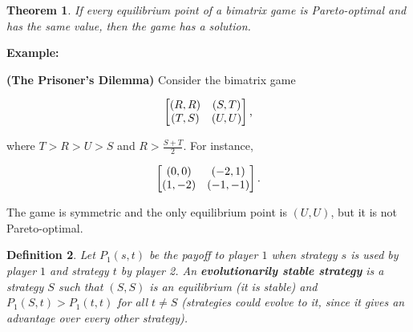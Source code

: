 \documentclass{article}
\theoremstyle{colontheorem}
\newtheorem{theorem}{Theorem}[section]
\newtheorem{definition}[theorem]{Definition}
\newenvironment{Theorem}
{
	\begin{mdframed}[backgroundcolor=TheoremOrange!10]
	\begin{theorem}
}
{
	\end{theorem}
	\end{mdframed}
	
	\vspace{.15in}
}
\newenvironment{Def}
{
	\begin{mdframed}[backgroundcolor=DefGreen!10]
	\begin{definition}
}
{
	\end{definition}
	\end{mdframed}
	
	\vspace{.15in}
}
\newenvironment{Example}
{
	\begin{mdframed}
	\textbf{Example:}%
}
{
	\end{mdframed}
	
	\vspace{.15in}
}
\begin{document}
\begin{Theorem}
	
	If every equilibrium point of a bimatrix game is Pareto-optimal and has the same value, then the game has a solution.
	
\end{Theorem}



\begin{Example}
	\textbf{(The Prisoner's Dilemma)} Consider the bimatrix game
	
	$$
	\begin{bmatrix}
	
	(R, R) & (S, T)\\
	(T, S) & (U, U)
	
	\end{bmatrix}\textnormal{,}
	$$
	
	where $T > R > U > S$ and $R > \frac{S+T}{2}$. For instance,
	
	$$
	\begin{bmatrix}
	
	(0, 0) & (-2, 1)\\
	(1, -2) & (-1, -1)
	
	\end{bmatrix}\textnormal{.}
	$$
	
	The game is symmetric and the only equilibrium point is $(U, U)$, but it is not Pareto-optimal.
	
\end{Example}



\begin{Def}
	
	Let $P_1(s, t)$ be the payoff to player $1$ when strategy $s$ is used by player $1$ and strategy $t$ by player 2. An \textbf{evolutionarily stable strategy} is a strategy $S$ such that $(S, S)$ is an equilibrium (it is stable) and $P_1(S, t) > P_1(t, t)$ for all $t \neq S$ (strategies could evolve to it, since it gives an advantage over every other strategy).
	
\end{Def}
\end{document}

